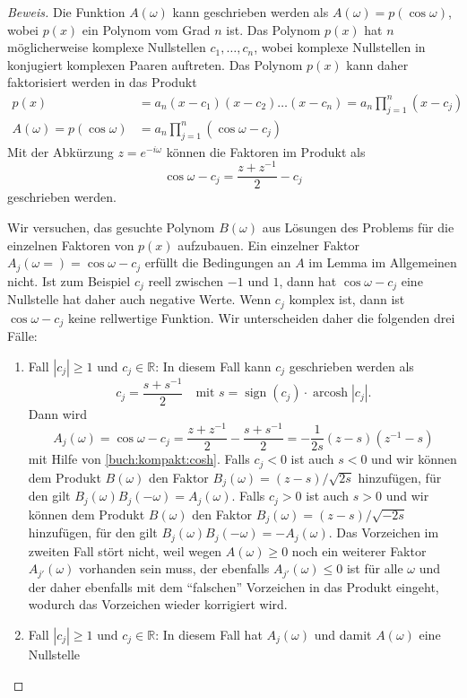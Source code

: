 \begin{proof}[Beweis]
Die Funktion $A(\omega)$ kann geschrieben werden als
$A(\omega) = p(\cos\omega)$, wobei $p(x)$ ein Polynom vom
Grad $n$ ist.
Das Polynom $p(x)$ hat $n$ möglicherweise komplexe Nullstellen
$c_1,\dots,c_n$, wobei komplexe Nullstellen in konjugiert komplexen
Paaren auftreten.
Das Polynom $p(x)$ kann daher faktorisiert werden in das Produkt
\begin{align*}
p(x)
&=
a_n(x-c_1)(x-c_2)\dots(x-c_n)
=
a_n \prod_{j=1}^n (x-c_j)
\\
A(\omega) = p(\cos\omega)
&=
a_n \prod_{j=1}^n (\cos \omega - c_j)
\end{align*}
Mit der Abkürzung $z=e^{-i\omega}$ können die Faktoren im Produkt als
\[
\cos\omega -c_j = \frac{z+z^{-1}}2-c_j
\]
geschrieben werden.

Wir versuchen, das gesuchte Polynom $B(\omega)$ aus Lösungen des Problems
für die einzelnen Faktoren von $p(x)$ aufzubauen.
Ein einzelner Faktor $A_j(\omega=)=\cos\omega - c_j$ erfüllt die Bedingungen an
$A$ im Lemma im Allgemeinen nicht.
Ist zum Beispiel $c_j$ reell zwischen $-1$ und $1$, dann hat
$\cos\omega-c_j$ eine Nullstelle hat daher auch negative Werte.
Wenn $c_j$ komplex ist, dann ist $\cos\omega-c_j$ keine rellwertige
Funktion.
Wir unterscheiden daher die folgenden drei Fälle:
\begin{enumerate}
\item
Fall $|c_j|\ge 1$ und $c_j\in\mathbb R$:
In diesem Fall kann $c_j$ geschrieben werden als
\[
c_j = \frac{s+s^{-1}}2
\quad
\text{mit $s=\operatorname{sign}(c_j)\cdot \operatorname{arcosh}|c_j|$.}
\]
Dann wird
\[
A_j(\omega)
=
\cos\omega - c_j
=
\frac{z+z^{-1}}2 - \frac{s+s^{-1}}2
=
-\frac1{2s} (z-s)(z^{-1}-s)
\]
mit Hilfe von \eqref{buch:kompakt:cosh}.
Falls $c_j < 0$ ist auch $s<0$ und wir können dem Produkt $B(\omega)$
den Faktor $B_j(\omega)=(z-s)/\sqrt{2s}$ hinzufügen, für den gilt
$B_j(\omega)B_j(-\omega)=A_j(\omega)$.
Falls $c_j > 0$ ist auch $s>0$ und wir können dem Produkt $B(\omega)$
den Faktor $B_j(\omega) =(z-s)/\sqrt{-2s}$ hinzufügen, für den
gilt $B_j(\omega)B_j(-\omega)=-A_j(\omega)$.
Das Vorzeichen im zweiten Fall stört nicht, weil wegen $A(\omega)\ge 0$
noch ein weiterer Faktor $A_{j'}(\omega)$ vorhanden sein muss, der ebenfalls
$A_{j'}(\omega)\le 0$ ist für alle $\omega$ und der daher ebenfalls
mit dem ``falschen'' Vorzeichen in das Produkt eingeht, wodurch das
Vorzeichen wieder korrigiert wird.
\item
Fall $|c_j|\ge 1$ und $c_j\in\mathbb R$:
In diesem Fall hat $A_j(\omega)$ und damit $A(\omega)$ eine Nullstelle

\end{enumerate}
\end{proof}
